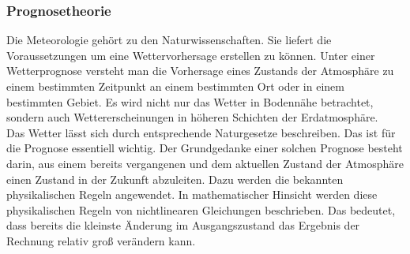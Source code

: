 \documentclass[a4paper,oneside,12pt,titlepage]{article}
\begin{document}
\subsubsection{Prognosetheorie} %
Die Meteorologie gehört zu den Naturwissenschaften. Sie liefert die Voraussetzungen um eine Wettervorhersage erstellen zu können. Unter einer Wetterprognose versteht man die Vorhersage eines Zustands der Atmosphäre zu einem bestimmten Zeitpunkt an einem bestimmten Ort oder in einem bestimmten Gebiet. Es wird nicht nur das Wetter in Bodennähe betrachtet, sondern auch Wettererscheinungen in höheren Schichten der  Erdatmosphäre.
\\
Das Wetter lässt sich durch entsprechende Naturgesetze beschreiben. Das ist für die Prognose essentiell wichtig. Der Grundgedanke einer solchen Prognose besteht darin, aus einem bereits vergangenen und dem aktuellen Zustand der Atmosphäre einen Zustand in der Zukunft abzuleiten. Dazu werden die bekannten physikalischen Regeln angewendet. In mathematischer Hinsicht werden diese physikalischen Regeln von nichtlinearen Gleichungen beschrieben. Das bedeutet, dass bereits die kleinste Änderung im Ausgangszustand das Ergebnis der Rechnung relativ groß verändern kann.%
\end{document}
